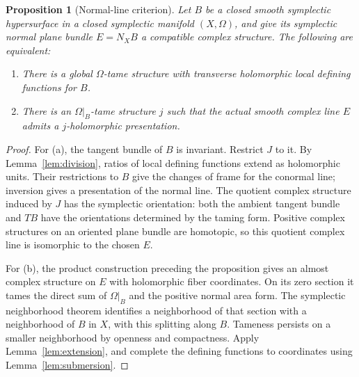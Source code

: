 \documentclass[11pt]{article}
\newtheorem{proposition}[theorem]{Proposition}
\theoremstyle{definition}
\theoremstyle{remark}
\begin{document}
\begin{proposition}[Normal-line criterion]\label{prop:normal}
Let $B$ be a closed smooth symplectic hypersurface in a closed symplectic manifold $(X,\Omega)$, and give its symplectic normal plane bundle $E=N_XB$ a compatible complex structure. The following are equivalent:
\begin{enumerate}[label=(\alph*),leftmargin=*]
\item There is a global $\Omega$-tame structure with transverse holomorphic local defining functions for $B$.
\item There is an $\Omega|_B$-tame structure $j$ such that the actual smooth complex line $E$ admits a $j$-holomorphic presentation.
\end{enumerate}
\end{proposition}
\begin{proof}
For (a), the tangent bundle of $B$ is invariant. Restrict $J$ to it. By Lemma~\ref{lem:division}, ratios of local defining functions extend as holomorphic units. Their restrictions to $B$ give the changes of frame for the conormal line; inversion gives a presentation of the normal line. The quotient complex structure induced by $J$ has the symplectic orientation: both the ambient tangent bundle and $TB$ have the orientations determined by the taming form. Positive complex structures on an oriented plane bundle are homotopic, so this quotient complex line is isomorphic to the chosen $E$.

For (b), the product construction preceding the proposition gives an almost complex structure on $E$ with holomorphic fiber coordinates. On its zero section it tames the direct sum of $\Omega|_B$ and the positive normal area form. The symplectic neighborhood theorem identifies a neighborhood of that section with a neighborhood of $B$ in $X$, with this splitting along $B$. Tameness persists on a smaller neighborhood by openness and compactness. Apply Lemma~\ref{lem:extension}, and complete the defining functions to coordinates using Lemma~\ref{lem:submersion}.
\end{proof}
\end{document}
